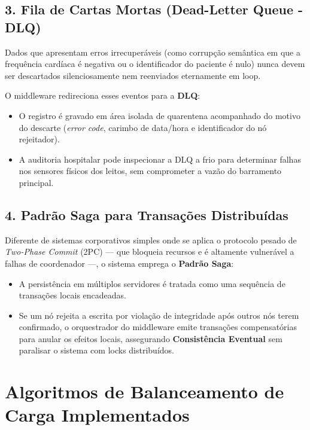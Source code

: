 \documentclass[11pt,a4paper]{article}
\begin{document}
\subsection{3. Fila de Cartas Mortas (Dead-Letter Queue - DLQ)}
Dados que apresentam erros irrecuperáveis (como corrupção semântica em que a frequência cardíaca é negativa ou o identificador do paciente é nulo) nunca devem ser descartados silenciosamente nem reenviados eternamente em loop.

O middleware redireciona esses eventos para a \textbf{DLQ}:
\begin{itemize}
    \item O registro é gravado em área isolada de quarentena acompanhado do motivo do descarte (\textit{error code}, carimbo de data/hora e identificador do nó rejeitador).
    \item A auditoria hospitalar pode inspecionar a DLQ a frio para determinar falhas nos sensores físicos dos leitos, sem comprometer a vazão do barramento principal.
\end{itemize}

\subsection{4. Padrão Saga para Transações Distribuídas}
Diferente de sistemas corporativos simples onde se aplica o protocolo pesado de \textit{Two-Phase Commit} (2PC) — que bloqueia recursos e é altamente vulnerável a falhas de coordenador —, o sistema emprega o \textbf{Padrão Saga}:
\begin{itemize}
    \item A persistência em múltiplos servidores é tratada como uma sequência de transações locais encadeadas.
    \item Se um nó rejeita a escrita por violação de integridade após outros nós terem confirmado, o orquestrador do middleware emite transações compensatórias para anular os efeitos locais, assegurando \textbf{Consistência Eventual} sem paralisar o sistema com locks distribuídos.
\end{itemize}

\section{Algoritmos de Balanceamento de Carga Implementados}
\end{document}
